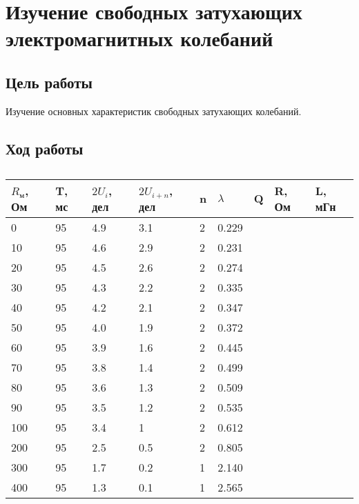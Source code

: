\chapter{Изучение свободных затухающих электромагнитных колебаний}

\section{Цель работы}

Изучение основных характеристик свободных затухающих колебаний.

\section{Ход работы}

\begin{table}[h]
	\caption{}
	\begin{tabularx}{\textwidth}{|X|X|X|X|X|X|X|X|X|}
		\hline 
		$R_\text{м}$, Ом & T, мс & $2U_i$, дел & $2U_{i+n}$, дел & n & $\lambda$ & Q & R, Ом & L, мГн \\ 
		\hline 
		0 & 95  & 4.9  & 3.1  & 2 & 0.229 &  &  &  \\ 
		\hline 
		10 & 95  & 4.6 & 2.9 & 2 & 0.231 &  &  &  \\ 
		\hline 
		20 & 95 & 4.5  & 2.6  & 2  & 0.274 &  &  &  \\ 
		\hline 
		30 & 95  & 4.3 & 2.2 & 2 & 0.335 &  &  &  \\ 
		\hline 
		40 & 95 & 4.2 & 2.1 & 2  & 0.347  &  &  &  \\ 
		\hline 
		50 & 95 & 4.0 & 1.9 & 2 & 0.372  &  &  &  \\ 
		\hline 
		60 & 95 & 3.9 & 1.6 & 2 & 0.445 &  &  &  \\ 
		\hline 
		70 & 95 & 3.8 & 1.4 & 2 & 0.499 &  &  &  \\ 
		\hline 
		80 & 95 & 3.6 & 1.3 & 2 & 0.509 &  &  &  \\ 
		\hline 
		90 & 95 & 3.5 & 1.2 & 2 & 0.535  &  &  &  \\ 
		\hline 
		100 & 95 & 3.4 & 1 & 2 & 0.612 &  &  &  \\ 
		\hline 
		200 & 95 & 2.5 & 0.5 & 2  & 0.805 &  &  &  \\ 
		\hline 
		300 & 95 & 1.7 & 0.2 & 1 & 2.140 &  &  &  \\ 
		\hline 
		400 & 95 & 1.3 & 0.1 & 1 & 2.565 &  &  &  \\ 
		\hline 
	\end{tabularx} 
\end{table}


